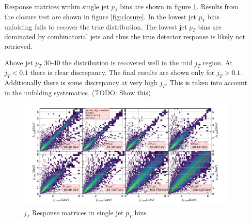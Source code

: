 Response matrices within single jet $p_T$ bins are shown in figure \ref{fig:response}. Results from the closure test are shown in figure \ref{fig:closure}. In the lowest jet $p_T$ bins unfolding fails to recover the true distribution. The lowest jet $p_T$ bins are dominated by combinatorial jets and thus the true detector response is likely not retrieved.

Above jet $p_T$ 30-40 \gev the distribution is recovered well in the mid $j_T$ region. At $j_T < 0.1$ there is clear discrepancy. The final results are shown only for $j_T > 0.1$. Additionally there is some discrepancy at very high $j_T$. This is taken into account in the unfolding systematics. {\color{red}(TODO: Show this) }
\begin{figure}
\includegraphics[width=0.99\textwidth]{figures/analysis/ResponseMatrixNFin00.pdf}
\caption{$j_T$ Response matrices in single jet $p_T$ bins}
\label{fig:response}
\end{figure}

